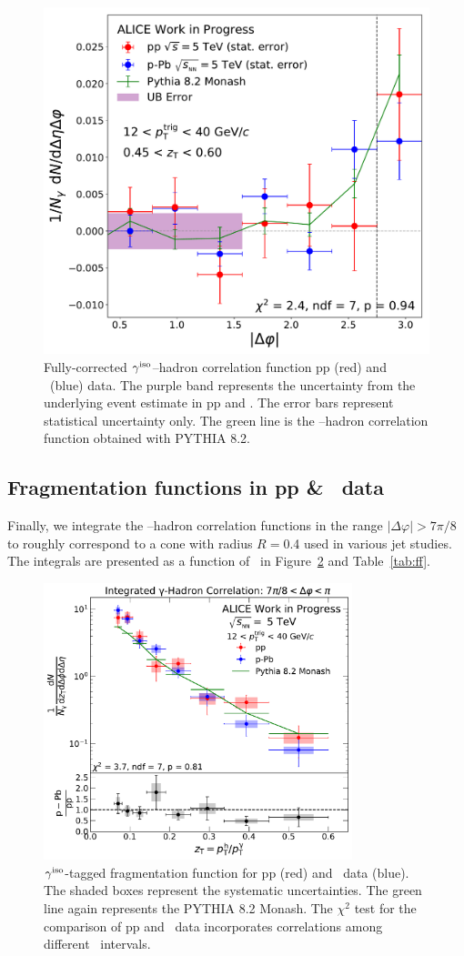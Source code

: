 \begin{figure}
\includegraphics[width = 0.24 \textwidth]{G-H_New/Cs_Final_Indv_pT_0_zT_7.pdf}
\caption{Fully-corrected $\gamma^\mathrm{iso}$--hadron correlation function pp (red) and \pPb~(blue) data. The purple band represents the uncertainty from the underlying event estimate in pp and \pPb. The error bars represent statistical uncertainty only. The green line is the \gammaiso--hadron correlation function obtained with \textsc{PYTHIA 8.2}.}
\label{fig:CorrelationFinal}
\end{figure}

\subsection{Fragmentation functions in pp \& \pPb~data}
\label{sec:Frag_Function}
Finally, we integrate the \gammaiso--hadron correlation functions in the range $|\Delta\varphi|>7\pi/8$ to roughly correspond to a cone with radius $R=$0.4 used in various jet studies. The integrals are presented as a function of \zt~in Figure~\ref{ff} and Table~\ref{tab:ff}. 

\begin{figure}[h]
\center
\includegraphics[width=0.8\textwidth]{G-H_New/Final_FFunction_and_Ratio.pdf}
\caption{$\gamma^\mathrm{iso}$-tagged fragmentation function for pp (red) and \pPb~data (blue). The shaded boxes represent the systematic uncertainties. The green line again represents the \textsc{PYTHIA 8.2} Monash. The $\chi^2$ test for the comparison of pp and \pPb~data incorporates correlations among different \zt~intervals.}
\label{ff}
\end{figure}

